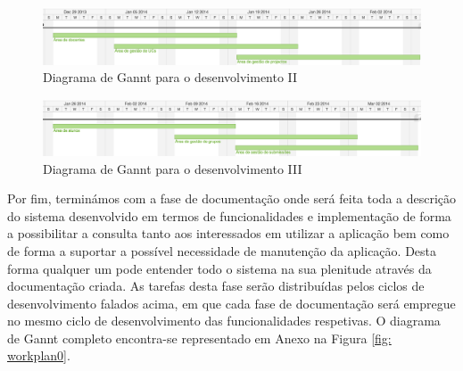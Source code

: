 \begin{figure}[htbp!] 
  \centering
  \includegraphics[width=1\textwidth]{images/plano_de_trabalho/gannt_3.png}
  \caption{Diagrama de Gannt para o desenvolvimento II}
  \label{fig: workplan3}
\end{figure}

\begin{figure}[htbp!] 
  \centering
  \includegraphics[width=1\textwidth]{images/plano_de_trabalho/gannt_4.png}
  \caption{Diagrama de Gannt para o desenvolvimento III}
  \label{fig: workplan4}
\end{figure}

Por fim, terminámos com a fase de documentação onde será feita toda a descrição 
do sistema desenvolvido em termos de funcionalidades e implementação de forma a 
possibilitar a consulta tanto aos interessados em utilizar a aplicação bem como 
de forma a suportar a possível necessidade de manutenção da aplicação. Desta 
forma qualquer um pode entender todo o sistema na sua plenitude através da 
documentação criada. As tarefas desta fase serão distribuídas pelos ciclos de 
desenvolvimento falados acima, em que cada fase de documentação será empregue no 
mesmo ciclo de desenvolvimento das funcionalidades respetivas.
O diagrama de Gannt completo encontra-se representado em Anexo na Figura \ref{fig: 
workplan0}.

